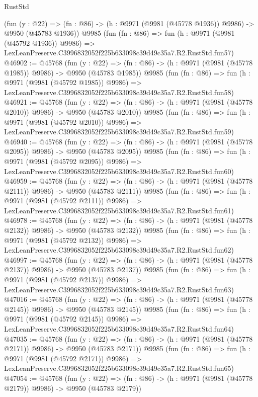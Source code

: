 \begin{lexlean}{RustStd}
\begin{coremodule}
    (fun (y : @22) =>
    (fn : @86) -> (h : @9971 (@9981 (@45778 @1936)) @9986) -> @9950 (@45783 @1936))
    @9985
    (fun (fn : @86) =>
    fun (h : @9971 (@9981 (@45792 @1936)) @9986) =>
    LexLeanPreserve.C3996832052f225b633098c39d49c35a7.R2.RustStd.fun57)
@46902 := @45768
    (fun (y : @22) =>
    (fn : @86) -> (h : @9971 (@9981 (@45778 @1985)) @9986) -> @9950 (@45783 @1985))
    @9985
    (fun (fn : @86) =>
    fun (h : @9971 (@9981 (@45792 @1985)) @9986) =>
    LexLeanPreserve.C3996832052f225b633098c39d49c35a7.R2.RustStd.fun58)
@46921 := @45768
    (fun (y : @22) =>
    (fn : @86) -> (h : @9971 (@9981 (@45778 @2010)) @9986) -> @9950 (@45783 @2010))
    @9985
    (fun (fn : @86) =>
    fun (h : @9971 (@9981 (@45792 @2010)) @9986) =>
    LexLeanPreserve.C3996832052f225b633098c39d49c35a7.R2.RustStd.fun59)
@46940 := @45768
    (fun (y : @22) =>
    (fn : @86) -> (h : @9971 (@9981 (@45778 @2095)) @9986) -> @9950 (@45783 @2095))
    @9985
    (fun (fn : @86) =>
    fun (h : @9971 (@9981 (@45792 @2095)) @9986) =>
    LexLeanPreserve.C3996832052f225b633098c39d49c35a7.R2.RustStd.fun60)
@46959 := @45768
    (fun (y : @22) =>
    (fn : @86) -> (h : @9971 (@9981 (@45778 @2111)) @9986) -> @9950 (@45783 @2111))
    @9985
    (fun (fn : @86) =>
    fun (h : @9971 (@9981 (@45792 @2111)) @9986) =>
    LexLeanPreserve.C3996832052f225b633098c39d49c35a7.R2.RustStd.fun61)
@46978 := @45768
    (fun (y : @22) =>
    (fn : @86) -> (h : @9971 (@9981 (@45778 @2132)) @9986) -> @9950 (@45783 @2132))
    @9985
    (fun (fn : @86) =>
    fun (h : @9971 (@9981 (@45792 @2132)) @9986) =>
    LexLeanPreserve.C3996832052f225b633098c39d49c35a7.R2.RustStd.fun62)
@46997 := @45768
    (fun (y : @22) =>
    (fn : @86) -> (h : @9971 (@9981 (@45778 @2137)) @9986) -> @9950 (@45783 @2137))
    @9985
    (fun (fn : @86) =>
    fun (h : @9971 (@9981 (@45792 @2137)) @9986) =>
    LexLeanPreserve.C3996832052f225b633098c39d49c35a7.R2.RustStd.fun63)
@47016 := @45768
    (fun (y : @22) =>
    (fn : @86) -> (h : @9971 (@9981 (@45778 @2145)) @9986) -> @9950 (@45783 @2145))
    @9985
    (fun (fn : @86) =>
    fun (h : @9971 (@9981 (@45792 @2145)) @9986) =>
    LexLeanPreserve.C3996832052f225b633098c39d49c35a7.R2.RustStd.fun64)
@47035 := @45768
    (fun (y : @22) =>
    (fn : @86) -> (h : @9971 (@9981 (@45778 @2171)) @9986) -> @9950 (@45783 @2171))
    @9985
    (fun (fn : @86) =>
    fun (h : @9971 (@9981 (@45792 @2171)) @9986) =>
    LexLeanPreserve.C3996832052f225b633098c39d49c35a7.R2.RustStd.fun65)
@47054 := @45768
    (fun (y : @22) =>
    (fn : @86) -> (h : @9971 (@9981 (@45778 @2179)) @9986) -> @9950 (@45783 @2179))

\end{coremodule}
\end{lexlean}
